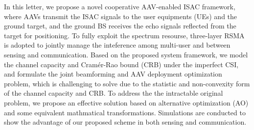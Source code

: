 \documentclass[twocolumn,journal]{IEEEtran}
\begin{document}
In this letter, we propose a novel cooperative AAV-enabled ISAC framework, where AAVs transmit the ISAC signals to the user equipments (UEs) and the ground target, and the ground BS receives the echo signals reflected from the target for positioning. To fully exploit the spectrum resourse, three-layer RSMA is adopted to jointly manage the inteference among multi-user and between sensing and communication. Based on the proposed system framework, we model the channel capacity and Cramér-Rao bound (CRB) under the imperfect CSI, and formulate the joint beamforming and AAV deployment optimization problem, which is challenging to solve due to the statistic and non-convexity form of the channel capacity and CRB. To address the the intractable original problem, we propose an effective solution based on alternative optimization (AO) and some equivalent mathmatical transformations. Simulations are conducted to show the advantage of our proposed scheme in both sensing and communication.
\end{document}
